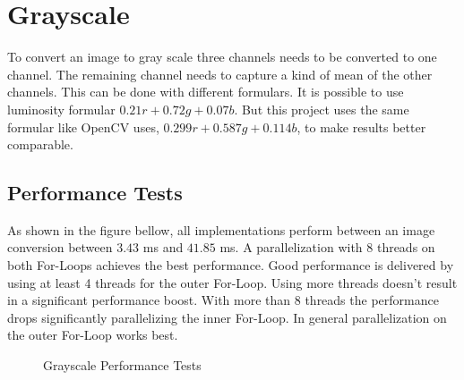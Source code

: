 \chapter{Grayscale}

\noindent
To convert an image to gray scale three channels needs to be converted to one channel. The remaining channel needs to capture a kind of mean of the other channels. This can be done with different formulars. It is possible to use luminosity formular $ 0.21r + 0.72g + 0.07b $. But this project uses the same formular like OpenCV uses, $ 0.299r + 0.587g + 0.114b $, to make results better comparable.

\section{Performance Tests}


\noindent
As shown in the figure bellow, all implementations perform between an image conversion between $ 3.43 $ ms and $ 41.85 $ ms. A parallelization with 8 threads on both For-Loops achieves the best performance. Good performance is delivered by using at least 4 threads for the outer For-Loop. Using more threads doesn't result in a significant performance boost. With more than 8 threads the performance drops significantly parallelizing the inner For-Loop. In general parallelization on the outer For-Loop works best.

\begin{center}
    \begin{figure}[H]
        \centering

        \caption{Grayscale Performance Tests}
    \end{figure}
\end{center}


